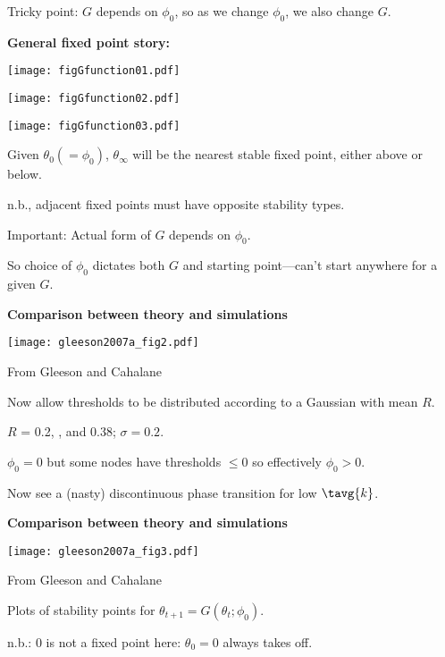 \begin{frame}[plain]
      Tricky point: $G$ depends on $\phi_0$, so as we change
      $\phi_0$, we also change $G$.
    
  


  \textbf{General fixed point story:}

      
    \texttt{[image: figGfunction01.pdf]}
    
    \texttt{[image: figGfunction02.pdf]}
    
    \texttt{[image: figGfunction03.pdf]}
  
  
   
    Given $\theta_0 (= \phi_0)$, $\theta_\infty$ will be 
    the nearest stable fixed point, either above or below.
   
    n.b., adjacent fixed points must have opposite stability types.
   
    \alert{Important:}
    Actual form of $G$ depends on $\phi_0$.  
  
    So choice of $\phi_0$ dictates both $G$ and starting
    point---can't start anywhere for a given $G$.
  


  \textbf{Comparison between theory and simulations}

      
    \texttt{[image: gleeson2007a\_fig2.pdf]}

    {\small From Gleeson and Cahalane\cite{gleeson2007a}}
    
    
     
      Now allow thresholds to be distributed
      according to a Gaussian with mean $R$.
     
      $R$ = \alert{0.2}, , and 0.38; $\sigma = 0.2$.
    
      $\phi_0 = 0$ but some nodes have thresholds $\le 0$
      so effectively $\phi_0 > 0$.
    
      Now see a (nasty) discontinuous phase transition
      for low $\tavg{k}$.
    
  
  \textbf{Comparison between theory and simulations}

      
    \texttt{[image: gleeson2007a\_fig3.pdf]}

    {\small From Gleeson and Cahalane\cite{gleeson2007a}}
    
    
     
      Plots of stability points for $\theta_{t+1} = G(\theta_t; \phi_0)$.
     
      n.b.: 0 is not a fixed point here: $\theta_0 = 0$ always takes off.
     

\end{frame}
